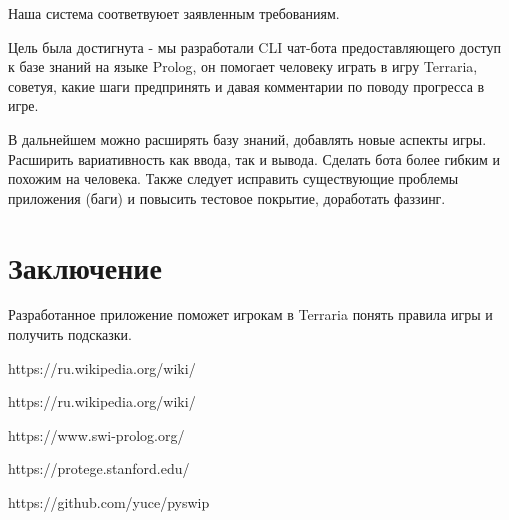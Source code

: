 \documentclass{article}
\begin{document}
Наша система соответвуюет заявленным требованиям.

Цель была достигнута - мы разработали CLI чат-бота предоставляющего
доступ к базе знаний на языке Prolog, он помогает человеку
играть в игру Terraria, советуя, какие шаги предпринять и
давая комментарии по поводу прогресса в игре.

В дальнейшем можно расширять базу знаний, добавлять новые аспекты
игры. Расширить вариативность как ввода, так и вывода. Сделать
бота более гибким и похожим на человека. Также следует исправить
существующие проблемы приложения (баги) и повысить тестовое покрытие,
доработать фаззинг.

\section{Заключение}

Разработанное приложение поможет игрокам в Terraria понять
правила игры и получить подсказки.

\begin{thebibliography}{9}

  https://ru.wikipedia.org/wiki/%

  https://ru.wikipedia.org/wiki/%

  https://www.swi-prolog.org/

  https://protege.stanford.edu/

  https://github.com/yuce/pyswip

\end{thebibliography}
\end{document}
